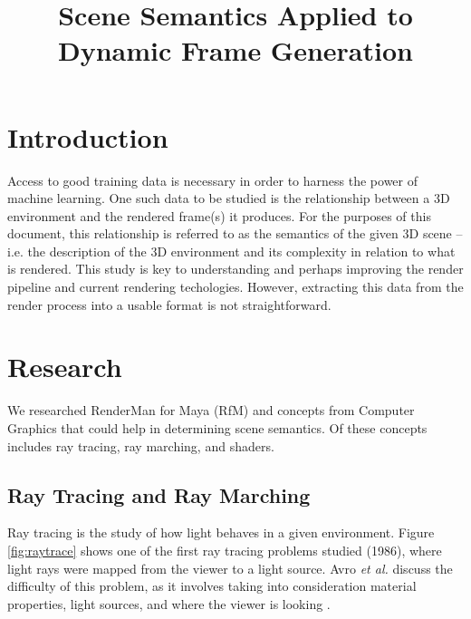 \documentclass[conference]{IEEEtran}
\begin{document}
\title{Scene Semantics Applied to \\ Dynamic Frame Generation}

\author{
}

\maketitle

\begin{abstract}
\end{abstract}

\section{Introduction}
\label{sec:introduction}
Access to good training data is necessary
in order to harness the power of machine learning.
One such data to be studied is the relationship
between a 3D environment and the
rendered frame(s) it produces.
For the purposes of this document, this relationship is
referred to as the semantics of the given 3D scene --
i.e. the description of the 3D environment and its complexity
in relation to what is rendered.
This study is key to understanding and perhaps improving the
render pipeline and current rendering techologies.
However, extracting this data from the render process into a usable
format is not straightforward.

\section{Research}
We researched RenderMan for Maya (RfM) and concepts from Computer Graphics
that could help in determining scene semantics.
Of these concepts includes ray tracing, ray marching, and shaders.

\subsection{Ray Tracing and Ray Marching}
Ray tracing is the study of how light behaves in a given environment.
Figure \ref{fig:raytrace}
shows one of the first ray tracing problems studied (1986), where light rays were mapped from
the viewer to a light source. Avro \textit{et al.}
discuss the difficulty of this problem,
as it involves taking into consideration material properties, light sources,
and where the viewer is looking \cite{backwards_raytrace}.
\end{document}
